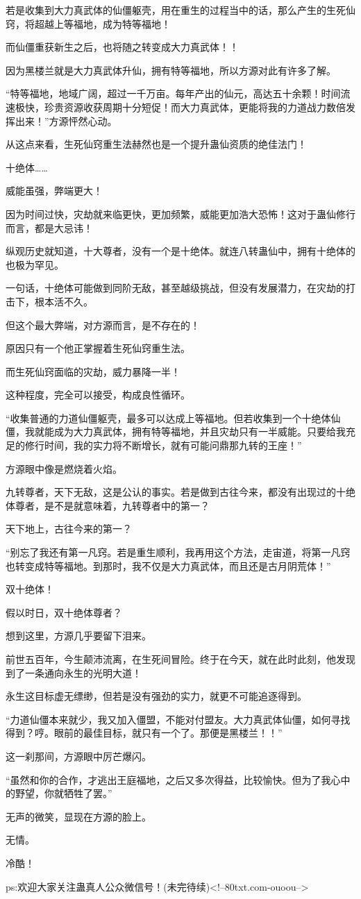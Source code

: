 \begin{this_body}
若是收集到大力真武体的仙僵躯壳，用在重生的过程当中的话，那么产生的生死仙窍，将超越上等福地，成为特等福地！

而仙僵重获新生之后，也将随之转变成大力真武体！！

因为黑楼兰就是大力真武体升仙，拥有特等福地，所以方源对此有许多了解。

“特等福地，地域广阔，超过一千万亩。每年产出的仙元，高达五十余颗！时间流速极快，珍贵资源收获周期十分短促！而大力真武体，更能将我的力道战力数倍发挥出来！”方源怦然心动。

从这点来看，生死仙窍重生法赫然也是一个提升蛊仙资质的绝佳法门！

十绝体……

威能虽强，弊端更大！

因为时间过快，灾劫就来临更快，更加频繁，威能更加浩大恐怖！这对于蛊仙修行而言，都是大忌讳！

纵观历史就知道，十大尊者，没有一个是十绝体。就连八转蛊仙中，拥有十绝体的也极为罕见。

一句话，十绝体可能做到同阶无敌，甚至越级挑战，但没有发展潜力，在灾劫的打击下，根本活不久。

但这个最大弊端，对方源而言，是不存在的！

原因只有一个他正掌握着生死仙窍重生法。

而生死仙窍面临的灾劫，威力暴降一半！

这种程度，完全可以接受，构成良性循环。

“收集普通的力道仙僵躯壳，最多可以达成上等福地。但若收集到一个十绝体仙僵，我就能成为大力真武体，拥有特等福地，并且灾劫只有一半威能。只要给我充足的修行时间，我的实力将不断增长，就有可能问鼎那九转的王座！”

方源眼中像是燃烧着火焰。

九转尊者，天下无敌，这是公认的事实。若是做到古往今来，都没有出现过的十绝体尊者，是不是就意味着，九转尊者中的第一？

天下地上，古往今来的第一？

“别忘了我还有第一凡窍。若是重生顺利，我再用这个方法，走宙道，将第一凡窍也转变成特等福地。到那时，我不仅是大力真武体，而且还是古月阴荒体！”

双十绝体！

假以时日，双十绝体尊者？

想到这里，方源几乎要留下泪来。

前世五百年，今生颠沛流离，在生死间冒险。终于在今天，就在此时此刻，他发现到了一条通向永生的光明大道！

永生这目标虚无缥缈，但若是没有强劲的实力，就更不可能追逐得到。

“力道仙僵本来就少，我又加入僵盟，不能对付盟友。大力真武体仙僵，如何寻找得到？哼。眼前的最佳目标，就只有一个了。那便是黑楼兰！！”

这一刹那间，方源眼中厉芒爆闪。

“虽然和你的合作，才逃出王庭福地，之后又多次得益，比较愉快。但为了我心中的野望，你就牺牲了罢。”

无声的微笑，显现在方源的脸上。

无情。

冷酷！

ps:欢迎大家关注蛊真人公众微信号！(未完待续)<!--80txt.com-ouoou-->

\end{this_body}

